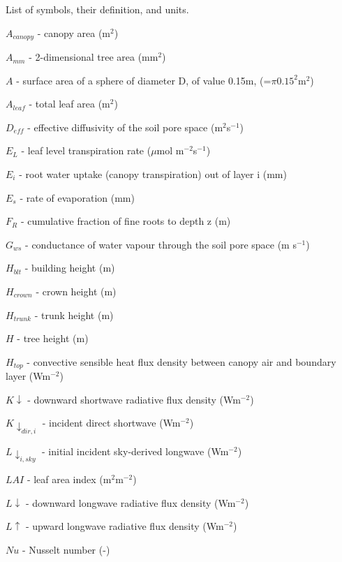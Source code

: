 

List of symbols, their definition, and units.
{\footnotesize
\begin{description} %


\item $A _{canopy}$  -  canopy area (m$^{2}$) 
\item $A _{mm}$  -  2-dimensional tree area (mm$^{2}$) 
\item $A$  -  surface area of a sphere of diameter D, of value 0.15m, (=$\pi 0.15^{2}$m$^{2}$) 
\item $A_{leaf}$  -  total leaf area (m$^{2}$) 
\item $D_{eff}$  -  effective diffusivity of the soil pore space (m$^{2}$s$^{-1}$) 
\item $E_{L}$  -  leaf level transpiration rate ($\mu$mol m$^{-2}$s$^{-1}$) 
\item $E_{i}$  -   root water uptake (canopy transpiration) out of layer i (mm) 
\item $E_{s}$  -  rate of evaporation (mm) 
\item $F_{R}$  -  cumulative fraction of fine roots to depth z (m) 
\item $G_{ws}$  -  conductance of water vapour through the soil pore space (m s$^{-1}$) 
\item $H _{blt}$  -  building height (m) 
\item $H _{crown}$  -  crown height (m) 
\item $H _{trunk}$  -  trunk height (m) 
\item $H$    -   tree height (m)
\item $H_{top}$  -    convective sensible heat flux density between canopy air and boundary layer (Wm$^{-2}$) 
\item $K\downarrow$  -  downward shortwave radiative flux density (Wm$^{-2}$) 
\item $K\downarrow_{dir,i}$   -  incident direct shortwave (Wm$^{-2}$)  
\item $L \downarrow_{i,sky}$   -   initial incident sky-derived longwave (Wm$^{-2}$)  
\item $LAI$  -  leaf area index (m$^{2}$m$^{-2}$) 
\item $L\downarrow$  -   downward longwave radiative flux density (Wm$^{-2}$)
\item $L\uparrow$  -  upward longwave radiative flux density (Wm$^{-2}$) 
\item $Nu$  -  Nusselt number (-) 

\end{description}}
